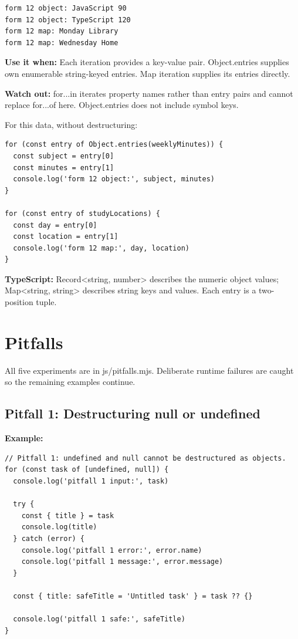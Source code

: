 \documentclass[10pt,a4paper]{article}
\begin{document}
\begin{lstlisting}[language={}]
form 12 object: JavaScript 90
form 12 object: TypeScript 120
form 12 map: Monday Library
form 12 map: Wednesday Home
\end{lstlisting}

\textbf{Use it when:} Each iteration provides a key-value pair. Object.entries supplies own enumerable string-keyed entries. Map iteration supplies its entries directly.

\textbf{Watch out:} for...in iterates property names rather than entry pairs and cannot replace for...of here. Object.entries does not include symbol keys.


For this data, without destructuring:

\begin{lstlisting}[language=GuideJS]
for (const entry of Object.entries(weeklyMinutes)) {
  const subject = entry[0]
  const minutes = entry[1]
  console.log('form 12 object:', subject, minutes)
}

for (const entry of studyLocations) {
  const day = entry[0]
  const location = entry[1]
  console.log('form 12 map:', day, location)
}
\end{lstlisting}

\textbf{TypeScript:} Record<string, number> describes the numeric object values; Map<string, string> describes string keys and values. Each entry is a two-position tuple.

\section{Pitfalls}

All five experiments are in js/pitfalls.mjs. Deliberate runtime failures are caught so the remaining examples continue.

\subsection{Pitfall 1: Destructuring null or undefined}


\textbf{Example:}

\begin{lstlisting}[language=GuideJS]
// Pitfall 1: undefined and null cannot be destructured as objects.
for (const task of [undefined, null]) {
  console.log('pitfall 1 input:', task)

  try {
    const { title } = task
    console.log(title)
  } catch (error) {
    console.log('pitfall 1 error:', error.name)
    console.log('pitfall 1 message:', error.message)
  }

  const { title: safeTitle = 'Untitled task' } = task ?? {}

  console.log('pitfall 1 safe:', safeTitle)
}
\end{lstlisting}
\end{document}
